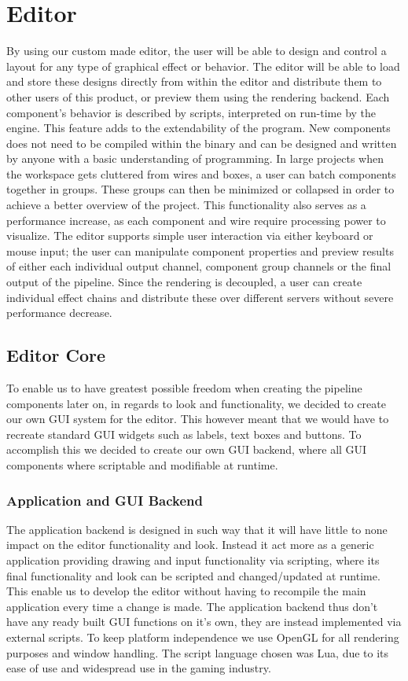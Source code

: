 
\chapter{Editor}
 
By using our custom made editor, the user will be able to design and control a layout for any type of graphical effect or behavior. The editor will be able to load and store these designs directly from within the editor and distribute them to other users of this product, or preview them using the rendering backend. 
Each component’s behavior is described by scripts, interpreted on run-time by the engine. This feature adds to the extendability of the program. New components does not need to be compiled within the binary and can be designed and written by anyone with a basic understanding of programming.
In large projects when the workspace gets cluttered from wires and boxes, a user can batch components together in groups. These groups can then be minimized or collapsed in order to achieve a better overview of the project. This functionality also serves as a performance increase, as each component and wire require processing power to visualize. 
The editor supports simple user interaction via either keyboard or mouse input; the user can manipulate component properties and preview results of either each individual output channel, component group channels or the final output of the pipeline. Since the rendering is decoupled, a user can create individual effect chains and distribute these over different servers without severe performance decrease. 

\section{Editor Core}
To enable us to have greatest possible freedom when creating the pipeline components later on, in regards to look and functionality, we decided to create our own GUI system for the editor. This however meant that we would have to recreate standard GUI widgets such as labels, text boxes and buttons. To accomplish this we decided to create our own GUI backend, where all GUI components where scriptable and modifiable at runtime.

\subsection{Application and GUI Backend}
The application backend is designed in such way that it will have little to none impact on the editor functionality and look. Instead it act more as a generic application providing drawing and input functionality via scripting, where its final functionality and look can be scripted and changed/updated at runtime. This enable us to develop the editor without having to recompile the main application every time a change is made. The application backend thus don't have any ready built GUI functions on it's own, they are instead implemented via external scripts. To keep platform independence we use OpenGL for all rendering purposes and window handling. The script language chosen was Lua, due to its ease of use and widespread use in the gaming industry.

